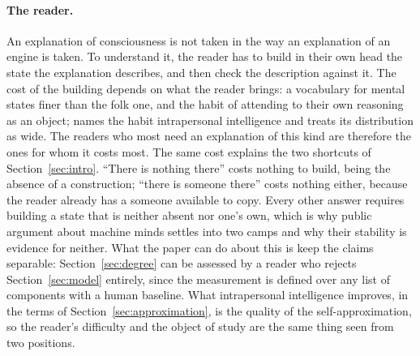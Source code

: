 \paragraph{The reader.}
An explanation of consciousness is not taken in the way an explanation of an engine is taken. To
understand it, the reader has to build in their own head the state the explanation describes, and then
check the description against it. The cost of the building depends on what the reader brings: a
vocabulary for mental states finer than the folk one, and the habit of attending to their own
reasoning as an object; \citet{gardner1983} names the habit intrapersonal intelligence and treats its
distribution as wide. The readers who most need an explanation of this kind are therefore the ones for
whom it costs most. The same cost explains the two shortcuts of Section~\ref{sec:intro}. ``There is
nothing there'' costs nothing to build, being the absence of a construction; ``there is someone
there'' costs nothing either, because the reader already has a someone available to copy. Every other
answer requires building a state that is neither absent nor one's own, which is why public argument
about machine minds settles into two camps and why their stability is evidence for neither. What the
paper can do about this is keep the claims separable: Section~\ref{sec:degree} can be assessed by a
reader who rejects Section~\ref{sec:model} entirely, since the measurement is defined over any list of
components with a human baseline. What intrapersonal intelligence improves, in the terms of
Section~\ref{sec:approximation}, is the quality of the self-approximation, so the reader's difficulty
and the object of study are the same thing seen from two positions.
